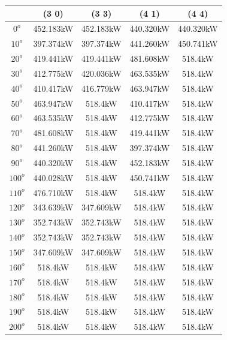         \begin{table}[H]
        	\centering
        	\begin{tabular}{|c|c|c|c|c|} \hline
        			& (3 0)		& (3 3)		& (4 1)		& (4 4)		\\ \hline
        		$0^o$	& 452.183kW	& 452.183kW	& 440.320kW	& 440.320kW	\\ \hline
        		$10^o$	& 397.374kW	& 397.374kW	& 441.260kW	& 450.741kW	\\ \hline
        		$20^o$	& 419.441kW	& 419.441kW	& 481.608kW	& 518.4kW	\\ \hline
        		$30^o$	& 412.775kW	& 420.036kW	& 463.535kW	& 518.4kW	\\ \hline
        		$40^o$	& 410.417kW	& 416.779kW	& 463.947kW	& 518.4kW	\\ \hline
        		$50^o$	& 463.947kW	& 518.4kW	& 410.417kW	& 518.4kW	\\ \hline
        		$60^o$	& 463.535kW	& 518.4kW	& 412.775kW	& 518.4kW	\\ \hline
        		$70^o$	& 481.608kW	& 518.4kW	& 419.441kW	& 518.4kW	\\ \hline
        		$80^o$	& 441.260kW	& 518.4kW	& 397.374kW	& 518.4kW	\\ \hline
        		$90^o$	& 440.320kW	& 518.4kW	& 452.183kW	& 518.4kW	\\ \hline
        		$100^o$	& 440.028kW	& 518.4kW	& 450.741kW	& 518.4kW	\\ \hline
        		$110^o$	& 476.710kW	& 518.4kW	& 518.4kW	& 518.4kW	\\ \hline
        		$120^o$	& 343.639kW	& 347.609kW	& 518.4kW	& 518.4kW	\\ \hline
        		$130^o$	& 352.743kW	& 352.743kW	& 518.4kW	& 518.4kW	\\ \hline
        		$140^o$	& 352.743kW	& 352.743kW	& 518.4kW	& 518.4kW	\\ \hline
        		$150^o$	& 347.609kW	& 347.609kW	& 518.4kW	& 518.4kW	\\ \hline
        		$160^o$	& 518.4kW	& 518.4kW	& 518.4kW	& 518.4kW	\\ \hline
        		$170^o$	& 518.4kW	& 518.4kW	& 518.4kW	& 518.4kW	\\ \hline
        		$180^o$	& 518.4kW	& 518.4kW	& 518.4kW	& 518.4kW	\\ \hline
        		$190^o$	& 518.4kW	& 518.4kW	& 518.4kW	& 518.4kW	\\ \hline
        		$200^o$	& 518.4kW	& 518.4kW	& 518.4kW	& 518.4kW	\\ \hline

\end{tabular}
\end{table}
